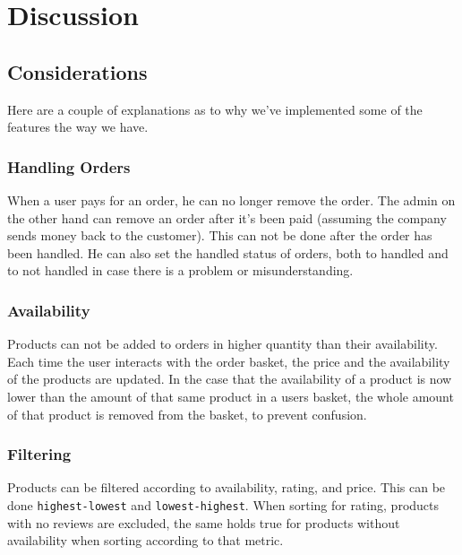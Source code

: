 \newpage
\section{Discussion}\label{sec:discussion}

\subsection{Considerations}

Here are a couple of explanations as to why we've implemented some of the
features the way we have.

\subsubsection{Handling Orders}

When a user pays for an order, he can no longer remove the order. The admin
on the other hand can remove an order after it's been paid (assuming the
company sends money back to the customer). This can not be done after the
order has been handled. He can also set the handled status of orders, both
to handled and to not handled in case there is a problem or misunderstanding.

\subsubsection{Availability}

Products can not be added to orders in higher quantity than their availability.
Each time the user interacts with the order basket, the price and the
availability of the products are updated. In the case that the availability
of a product is now lower than the amount of that same product in a users
basket, the whole amount of that product is removed from the basket, to
prevent confusion.

\subsubsection{Filtering}

Products can be filtered according to availability, rating,
and price. This can be done \texttt{highest-lowest} and
\texttt{lowest-highest}. When sorting for rating, products with no
reviews are excluded, the same holds true for products without availability
when sorting according to that metric.


